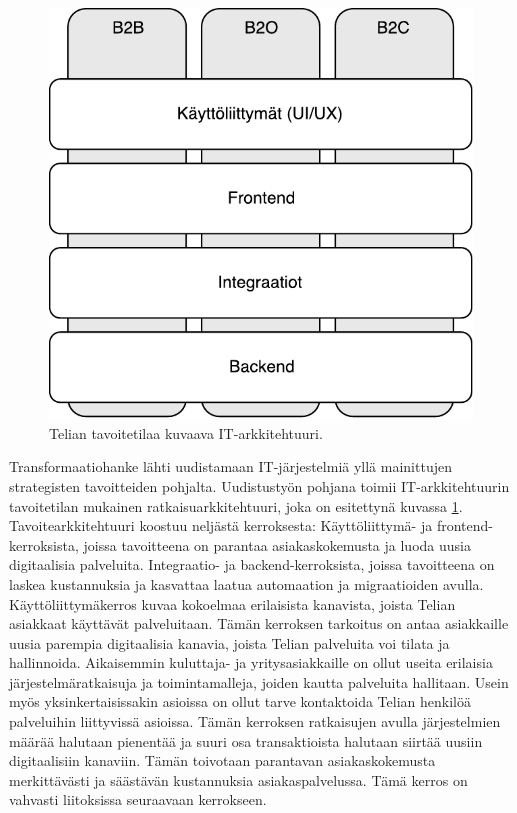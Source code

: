 \documentclass[finnish,12pt,a4paper,pdftex]{article}
\begin{document}
\begin{figure}[!h]
    \centering
    \includegraphics[scale=0.5]{images/ratkaisuarkkitehtuuri.pdf}
    \caption{Telian tavoitetilaa kuvaava IT-arkkitehtuuri.}
    \label{fig:ratkark}
\end{figure}

Transformaatiohanke lähti uudistamaan IT-järjestelmiä yllä mainittujen strategisten tavoitteiden pohjalta. Uudistustyön pohjana toimii IT-arkkitehtuurin tavoitetilan mukainen ratkaisuarkkitehtuuri, joka on esitettynä kuvassa \ref{fig:ratkark}. Tavoitearkkitehtuuri koostuu neljästä kerroksesta: Käyttöliittymä- ja frontend-kerroksista, joissa tavoitteena on parantaa asiakaskokemusta ja luoda uusia digitaalisia palveluita. Integraatio- ja backend-kerroksista, joissa tavoitteena on laskea kustannuksia ja kasvattaa laatua automaation ja migraatioiden avulla.\\

\noindent Käyttöliittymäkerros kuvaa kokoelmaa erilaisista kanavista, joista Telian asiakkaat käyttävät palveluitaan. Tämän kerroksen tarkoitus on antaa asiakkaille uusia parempia digitaalisia kanavia, joista Telian palveluita voi tilata ja hallinnoida. Aikaisemmin kuluttaja- ja yritysasiakkaille on ollut useita erilaisia järjestelmäratkaisuja ja toimintamalleja, joiden kautta palveluita hallitaan. Usein myös yksinkertaisissakin asioissa on ollut tarve kontaktoida Telian henkilöä palveluihin liittyvissä asioissa. Tämän kerroksen ratkaisujen avulla järjestelmien määrää halutaan pienentää ja suuri osa transaktioista halutaan siirtää uusiin digitaalisiin kanaviin. Tämän toivotaan parantavan asiakaskokemusta merkittävästi ja säästävän kustannuksia asiakaspalvelussa. Tämä kerros on vahvasti liitoksissa seuraavaan kerrokseen.\\
\end{document}
